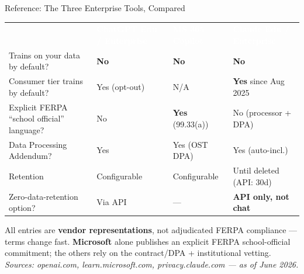 \documentclass[aspectratio=169, 10pt]{beamer}
\newcommand{\cmcite}[1]{{\scriptsize\color{CoolGray}\textit{#1}}}
\begin{document}
\begin{frame}{Reference: The Three Enterprise Tools, Compared}
\vskip-2pt
{\footnotesize
\begin{tabular}{>{\raggedright\arraybackslash}m{3.9cm} >{\centering\arraybackslash}m{2.7cm} >{\centering\arraybackslash}m{2.7cm} >{\centering\arraybackslash}m{2.7cm}}
\rowcolor{SlateTeal}
\textcolor{white}{\textbf{}} & \textcolor{white}{\textbf{ChatGPT Edu / Enterprise}} & \textcolor{white}{\textbf{MS 365 Copilot}} & \textcolor{white}{\textbf{Claude Edu / Enterprise}} \\[1pt]
\rowcolor{PaleSage}
Trains on your data by default? & \textcolor{GoGreen}{\textbf{No}} & \textcolor{GoGreen}{\textbf{No}} & \textcolor{GoGreen}{\textbf{No}} \\[1pt]
\rowcolor{white}
Consumer tier trains by default? & Yes (opt-out) & N/A & \textbf{Yes} since Aug 2025 \\[1pt]
\rowcolor{PaleSage}
Explicit FERPA ``school official'' language? & \textcolor{SoftCoral}{No} & \textcolor{GoGreen}{\textbf{Yes}} (99.33(a)) & \textcolor{SoftCoral}{No} (processor + DPA) \\[1pt]
\rowcolor{white}
Data Processing Addendum? & Yes & Yes (OST DPA) & Yes (auto-incl.) \\[1pt]
\rowcolor{PaleSage}
Retention & Configurable & Configurable & Until deleted (API: 30d) \\[1pt]
\rowcolor{white}
Zero-data-retention option? & Via API & --- & \textbf{API only, not chat} \\[1pt]
\end{tabular}
}
\vskip4pt
\begin{tcolorbox}[quotebox, width=13cm, top=2pt, bottom=2pt]
\scriptsize All entries are \textbf{vendor representations}, not adjudicated FERPA compliance --- terms change fast. \textbf{Microsoft} alone publishes an explicit FERPA school-official commitment; the others rely on the contract/DPA + institutional vetting. \cmcite{Sources: openai.com, learn.microsoft.com, privacy.claude.com --- as of June 2026.}
\end{tcolorbox}
\end{frame}
\end{document}
